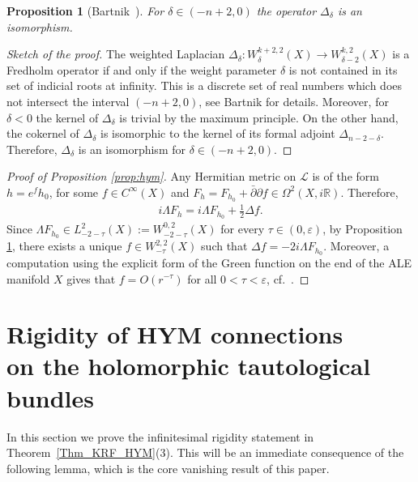 \documentclass[10pt,a4paper]{amsart}
\numberwithin{equation}{section}
\newcommand{\cL}{\mathcal{L}}
\newcommand{\R}{{\mathbb R}}
\renewcommand{\epsilon}{\varepsilon}
\newcommand{\eps}{\epsilon}
\newcommand{\delbar}{\bar \del}
\newcommand{\del}{\partial}
\newtheorem{Proposition}[Theorem]{Proposition}
 { \theoremstyle{definition}
\newtheorem{Definition}[Theorem]{Definition}
\newtheorem{Remark}[Theorem]{Remark} }
\begin{document}
\begin{Proposition}[Bartnik~]\label{prop:Laplace}
  For $\delta\in(-n+2,0)$ the operator $\Delta_{\delta}$ is an isomorphism.
\end{Proposition}

\begin{proof}[Sketch of the proof]
  The weighted Laplacian $\Delta_\delta \colon W^{k+2,2}_\delta(X) \to W^{k,2}_{\delta-2}(X)$ is a Fredholm operator if and only if the weight parameter $\delta$ is not contained in its set of indicial roots at inf\/inity.
  This is a discrete set of real numbers which does not intersect the
  interval $(-n+2, 0)$, see Bartnik \cite[Sections~1 and~2]{Bartnik1986} for details.  Moreover, for $\delta<0$ the kernel of
  $\Delta_\delta$ is trivial by the maximum principle.  On the other
  hand, the cokernel of $\Delta_{\delta}$ is isomorphic to the kernel
  of its formal adjoint $\Delta_{n-2-\delta}$.  Therefore,
  $\Delta_\delta$ is an isomorphism for $\delta \in (-n+2,0)$.
\end{proof}

\begin{proof}[Proof of Proposition \ref{prop:hym}]
  Any Hermitian metric on $\cL$ is of the form $h = e^f h_0$, for some
  $f \in C^\infty(X)$ and $F_h=F_{h_0} + \delbar\del f \in
  \Omega^2(X,i\R)$. Therefore,
  \begin{gather*}
    i\Lambda F_h = i\Lambda F_{h_0} + \tfrac12 \Delta f.
  \end{gather*}
  Since $\Lambda F_{h_0}\in L^2_{-2-\tau}(X):=W^{0,2}_{-2-\tau}(X)$ for
  every $\tau\in(0,\epsilon)$, by Proposition \ref{prop:Laplace},
  there exists a unique $f\in W^{2,2}_{-\tau}(X)$ such that $\Delta f
  =-2i\Lambda F_{h_0}$. Moreover, a computation using the explicit
  form of the Green function on the end of the ALE manifold $X$ gives
  that $f=O(r^{-{\tau}})$ for all $0<\tau<\eps$, cf.~\cite[(proof of) Theorem~8.3.5]{Joyce2000}.
  \end{proof}


\section[Rigidity of HYM connections on the holomorphic tautological bundles]{Rigidity of HYM connections\\ on the holomorphic tautological bundles}\label{sec:rigid}

In this section we prove the inf\/initesimal rigidity statement in
Theorem~\ref{Thm_KRF_HYM}(3).  This will be an immediate
consequence of the following lemma, which is the core vanishing result
of this paper.
\end{document}
